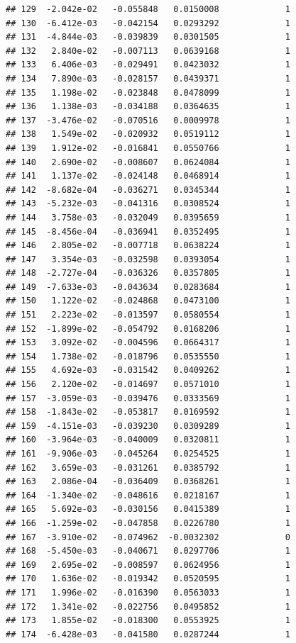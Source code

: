 \documentclass[12pt]{article}\usepackage[]{graphicx}\usepackage[]{xcolor}
\makeatletter
\newenvironment{kframe}{%
 \def\at@end@of@kframe{}%
 \ifinner\ifhmode%
  \def\at@end@of@kframe{\end{minipage}}%
  \begin{minipage}{\columnwidth}%
 \fi\fi%
 \def\FrameCommand##1{\hskip\@totalleftmargin \hskip-\fboxsep
 \colorbox{shadecolor}{##1}\hskip-\fboxsep
     \hskip-\linewidth \hskip-\@totalleftmargin \hskip\columnwidth}%
 \MakeFramed {\advance\hsize-\width
   \@totalleftmargin\z@ \linewidth\hsize
   \@setminipage}}%
 {\par\unskip\endMakeFramed%
 \at@end@of@kframe}
\newenvironment{knitrout}{}{} %
\makeatother
\begin{document}
\begin{knitrout}
\begin{kframe}
\begin{verbatim}
## 129  -2.042e-02   -0.055848   0.0150008             1
## 130  -6.412e-03   -0.042154   0.0293292             1
## 131  -4.844e-03   -0.039839   0.0301505             1
## 132   2.840e-02   -0.007113   0.0639168             1
## 133   6.406e-03   -0.029491   0.0423032             1
## 134   7.890e-03   -0.028157   0.0439371             1
## 135   1.198e-02   -0.023848   0.0478099             1
## 136   1.138e-03   -0.034188   0.0364635             1
## 137  -3.476e-02   -0.070516   0.0009978             1
## 138   1.549e-02   -0.020932   0.0519112             1
## 139   1.912e-02   -0.016841   0.0550766             1
## 140   2.690e-02   -0.008607   0.0624084             1
## 141   1.137e-02   -0.024148   0.0468914             1
## 142  -8.682e-04   -0.036271   0.0345344             1
## 143  -5.232e-03   -0.041316   0.0308524             1
## 144   3.758e-03   -0.032049   0.0395659             1
## 145  -8.456e-04   -0.036941   0.0352495             1
## 146   2.805e-02   -0.007718   0.0638224             1
## 147   3.354e-03   -0.032598   0.0393054             1
## 148  -2.727e-04   -0.036326   0.0357805             1
## 149  -7.633e-03   -0.043634   0.0283684             1
## 150   1.122e-02   -0.024868   0.0473100             1
## 151   2.223e-02   -0.013597   0.0580554             1
## 152  -1.899e-02   -0.054792   0.0168206             1
## 153   3.092e-02   -0.004596   0.0664317             1
## 154   1.738e-02   -0.018796   0.0535550             1
## 155   4.692e-03   -0.031542   0.0409262             1
## 156   2.120e-02   -0.014697   0.0571010             1
## 157  -3.059e-03   -0.039476   0.0333569             1
## 158  -1.843e-02   -0.053817   0.0169592             1
## 159  -4.151e-03   -0.039230   0.0309289             1
## 160  -3.964e-03   -0.040009   0.0320811             1
## 161  -9.906e-03   -0.045264   0.0254525             1
## 162   3.659e-03   -0.031261   0.0385792             1
## 163   2.086e-04   -0.036409   0.0368261             1
## 164  -1.340e-02   -0.048616   0.0218167             1
## 165   5.692e-03   -0.030156   0.0415389             1
## 166  -1.259e-02   -0.047858   0.0226780             1
## 167  -3.910e-02   -0.074962  -0.0032302             0
## 168  -5.450e-03   -0.040671   0.0297706             1
## 169   2.695e-02   -0.008597   0.0624956             1
## 170   1.636e-02   -0.019342   0.0520595             1
## 171   1.996e-02   -0.016390   0.0563033             1
## 172   1.341e-02   -0.022756   0.0495852             1
## 173   1.855e-02   -0.018300   0.0553925             1
## 174  -6.428e-03   -0.041580   0.0287244             1

\end{verbatim}
\end{kframe}
\end{knitrout}
\end{document}
